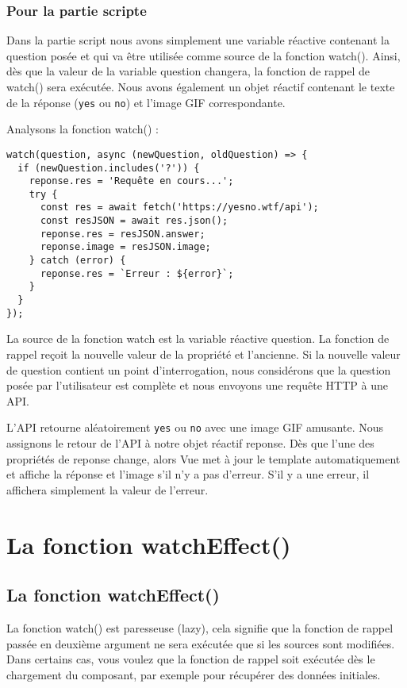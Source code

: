 \subsubsection{Pour la partie {\color{monOrange}scripte}}
Dans la partie script nous avons simplement une variable réactive contenant la question posée et qui va être utilisée comme source de la fonction {\color{monOrange}watch()}. Ainsi, dès que la valeur de la variable question changera, la fonction de rappel de watch() sera exécutée. Nous avons également un objet réactif contenant le texte de la réponse ({\tt yes} ou {\tt no}) et l'image GIF correspondante.

Analysons la fonction watch() :
\begin{verbatim}
watch(question, async (newQuestion, oldQuestion) => {
  if (newQuestion.includes('?')) {
    reponse.res = 'Requête en cours...';
    try {
      const res = await fetch('https://yesno.wtf/api');
      const resJSON = await res.json();
      reponse.res = resJSON.answer;
      reponse.image = resJSON.image;
    } catch (error) {
      reponse.res = `Erreur : ${error}`;
    }
  }
});
\end{verbatim}
La source de la fonction {\color{monOrange}watch} est la variable réactive {\color{monOrange}question}. La fonction de rappel reçoit la nouvelle valeur de la propriété et l'ancienne. Si la nouvelle valeur de {\color{monOrange}question} contient un point d'interrogation, nous considérons que la question posée par l'utilisateur est complète et nous envoyons une requête HTTP à une API.

L'API retourne aléatoirement {\tt yes} ou {\tt no} avec une image GIF amusante. Nous assignons le retour de l'API à notre objet réactif {\color{monOrange}reponse}. Dès que l'une des propriétés de reponse change, alors {\color{monOrange}Vue} met à jour le {\color{monOrange}template} automatiquement et affiche la réponse et l'image s'il n'y a pas d'erreur. S'il y a une erreur, il affichera simplement la valeur de l'erreur.

\section{La fonction watchEffect()}
\subsection{La fonction {\color{monOrange}watchEffect()}}
La fonction {\color{monOrange}watch()} est paresseuse ({\color{monOrange}lazy}), cela signifie que la fonction de rappel passée en deuxième argument ne sera exécutée que si les sources sont modifiées. Dans certains cas, vous voulez que la fonction de rappel soit exécutée dès le chargement du composant, par exemple pour récupérer des données initiales.


